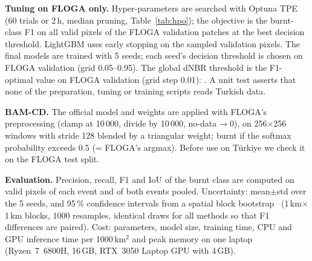 \textbf{Tuning on FLOGA only.} Hyper-parameters are searched with Optuna TPE~\cite{akiba2019optuna} (60 trials or 2\,h,
median pruning, Table~\ref{tab:hpo}); the objective is the burnt-class F1 on all valid pixels of the FLOGA validation patches at the best
decision threshold. LightGBM uses early stopping on the sampled validation pixels. The final models are trained with
5 seeds; each seed's decision threshold is chosen on FLOGA validation (grid 0.05--0.95). The global dNBR threshold
is the F1-optimal value on FLOGA validation (grid step 0.01): \DnbrFlogaThr. A unit test asserts that none of the
preparation, tuning or training scripts reads Turkish data.

\textbf{BAM-CD.} The official model and weights are applied with FLOGA's preprocessing (clamp at 10\,000, divide by
10\,000, no-data$\to$0), on 256$\times$256 windows with stride 128 blended by a triangular weight; burnt if the softmax
probability exceeds 0.5 (= FLOGA's argmax). Before use on Türkiye we check it on the FLOGA test split.

\textbf{Evaluation.} Precision, recall, F1 and IoU of the burnt class are computed on valid pixels of each event and of
both events pooled. Uncertainty: mean$\pm$std over the 5 seeds, and 95\,\% confidence intervals from a spatial block
bootstrap~\cite{kunsch1989bootstrap} (1\,km$\times$1\,km blocks, 1000 resamples, identical draws for all methods so
that F1 differences are paired). Cost: parameters, model size, training time, CPU and GPU inference time per
1000\,km$^2$ and peak memory on one laptop (Ryzen~7~6800H, 16\,GB, RTX~3050 Laptop GPU with 4\,GB).
